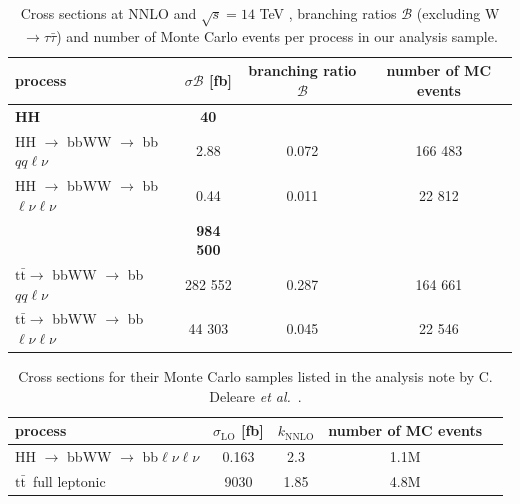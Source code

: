 \documentclass[10pt,a4paper]{article}
\renewcommand{\tt}{$\text{t}\bar{\text{t}}$}
\newcommand{\di}{$\rightarrow$ bbWW $\rightarrow$ bb$\ell\nu \ell\nu$}
\newcommand{\semi}{$\rightarrow$ bbWW $\rightarrow$ bb$qq\ell\nu$}
\newcommand{\sAN}{$\sigma_1$}
\newcommand{\BR}{\mathcal{B}}
\newcommand{\etal}{\emph{et al.}}
\begin{document}
\begin{table}[p]
	\centering
	\caption{Cross sections at NNLO and $\sqrt{s}=14$ TeV \cite{sigma_HH}\cite{sigma_tt}, branching ratios $\BR$ (excluding W $\rightarrow \tau\bar{\tau}$) \cite{BR_HH}\cite{BR_tt}\cite{BR_W} and number of Monte Carlo events per process in our analysis sample.} \vspace{5pt}
	\label{sigma}
	\begin{tabular}{@{}lccc@{}}
	\toprule
	process      & $\sigma\BR$ [fb] & branching ratio $\BR$ & number of MC events \\
	\midrule
	\textbf{HH}  & \textbf{40}      &           & \\ %
	HH \semi     &        2.88      &   0.072   &  166 483  \\
	HH \di       &        0.44      &   0.011   &   22 812  \\
	\bm{\tt}     & \textbf{984 500} &           & \\ %
	\tt \semi    &     282 552      &   0.287   &  164 661  \\
	\tt \di      &      44 303      &   0.045   &   22 546  \\
	\bottomrule
	\end{tabular}
\end{table}


\begin{table}[p]
	\centering
	\caption{Cross sections for their Monte Carlo samples listed in the analysis note by C. Deleare \etal\ \cite{AN}.} \vspace{5pt} %
	\label{sigma_AN}
	\begin{tabular}{@{}lcccc@{}}
	\toprule
	process            & $\sigma_\text{LO}$ [fb] & $k_\text{NNLO}$ & number of MC events \\
	\midrule
	HH \di             &  0.163  &   2.3   & 1.1M \\
	\tt\ full leptonic &  9030   &  1.85   & 4.8M \\
	\bottomrule
	\end{tabular}
\end{table}
\end{document}
